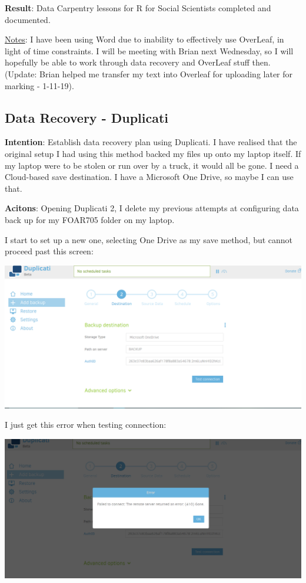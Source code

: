 \documentclass{article}
\begin{document}
\textbf{Result}: Data Carpentry lessons for R for Social Scientists completed and documented.

\underline{Notes}: I have been using Word due to inability to effectively use OverLeaf, in light of time constraints. I will be meeting with Brian next Wednesday, so I will hopefully be able to work through data recovery and OverLeaf stuff then. (Update: Brian helped me transfer my text into Overleaf for uploading later for marking - 1-11-19).

\subsection{Data Recovery - Duplicati}

\textbf{Intention}: Establish data recovery plan using Duplicati. I have realised that the original setup I had using this method backed my files up onto my laptop itself. If my laptop were to be stolen or run over by a truck, it would all be gone. I need a Cloud-based save destination. I have a Microsoft One Drive, so maybe I can use that.

\textbf{Acitons}: Opening Duplicati 2, I delete my previous attempts at configuring data back up for my FOAR705 folder on my laptop.

{\item I start to set up a new one, selecting One Drive as my save method, but cannot proceed past this screen:}

\includegraphics[width=1.0\textwidth]{duplicati_31.PNG}

I just get this error when testing connection: 

\includegraphics[width=1.0\textwidth]{duplicati_32.PNG}
\end{document}
